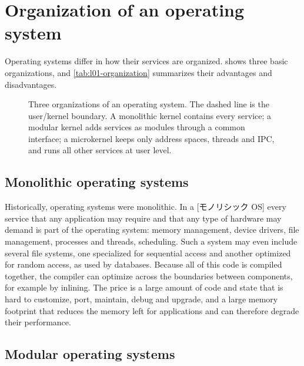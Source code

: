 \documentclass[../main.tex]{subfiles}
\begin{document}
\section{Organization of an operating system}
\label{sec:l01-organization}

Operating systems differ in how their services are
organized.   shows three basic
organizations, and \cref{tab:l01-organization} summarizes their advantages
and disadvantages.

\begin{figure}[htbp]
  \centering
  
  \caption{Three organizations of an operating system.  The dashed line is
    the user/kernel boundary.  A monolithic kernel contains every service;
    a modular kernel adds services as modules through a common interface;
    a microkernel keeps only address spaces, threads and IPC, and runs
    all other services at user level.}
  \label{fig:l01-structures}
\end{figure}

\subsection{Monolithic operating systems}

Historically, operating systems were monolithic.  In a
[モノリシック OS] every service that any
application may require and that any type of hardware may demand is part
of the operating system: memory management, device drivers, file
management, processes and threads, scheduling.  Such a system may even
include several file systems, one specialized for sequential access and
another optimized for random access, as used by databases.  Because all
of this code is compiled together, the compiler can optimize across the
boundaries between components, for example by inlining.  The price is a
large amount of code and state that is hard to customize, port, maintain,
debug and upgrade, and a large memory footprint that reduces the memory
left for applications and can therefore degrade their performance.

\subsection{Modular operating systems}
\end{document}
